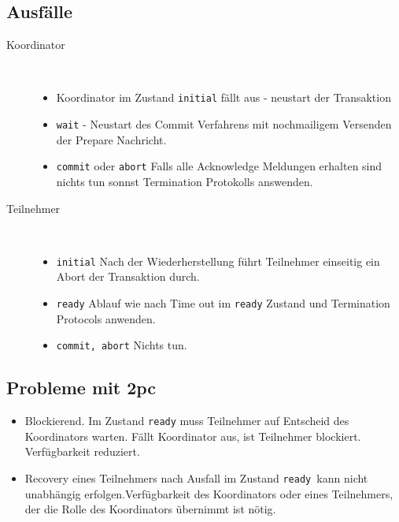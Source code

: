 \documentclass[a4paper,10pt,titlepage=false]{scrreprt}
\begin{document}
\subsection{Ausfälle} %
\label{sub:ausf_lle}
\begin{description}
  \item[Koordinator] \hfill \\
  \begin{itemize}
     \item Koordinator im Zustand \texttt{initial} fällt aus - neustart der Transaktion
     \item \texttt{wait} - Neustart des Commit Verfahrens mit nochmailigem Versenden der Prepare Nachricht.
     \item \texttt{commit} oder \texttt{abort} 
     \subitem Falls alle Acknowledge Meldungen erhalten sind nichts tun sonnst Termination Protokolls answenden.
   \end{itemize} 
   \item[Teilnehmer] \hfill \\
   \begin{itemize}
     \item \texttt{initial} Nach der Wiederherstellung führt Teilnehmer einseitig ein Abort der Transaktion durch.
     \item \texttt{ready} Ablauf wie nach Time out im \texttt{ready} Zustand und Termination Protocols anwenden.
     \item \texttt{commit, abort} Nichts tun.
   \end{itemize}
\end{description}
\subsection{Probleme mit 2pc} %
\label{sub:probleme_mit_2pc}
\begin{itemize}
  \item Blockierend. Im Zustand \texttt{ready} muss Teilnehmer auf Entscheid des Koordinators warten. Fällt Koordinator aus, ist Teilnehmer blockiert. Verfügbarkeit reduziert.
  \item Recovery eines Teilnehmers nach Ausfall im Zustand \texttt{ready }kann nicht unabhängig erfolgen.Verfügbarkeit des Koordinators oder eines Teilnehmers, der
die Rolle des Koordinators übernimmt ist nötig.

\end{itemize}
\end{document}
